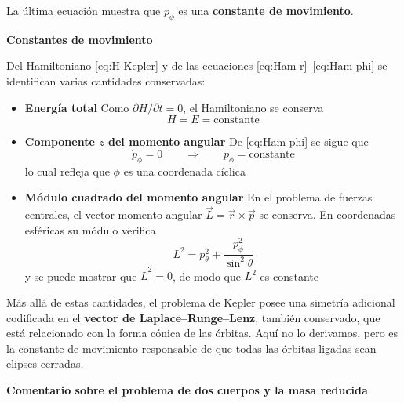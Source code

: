 \documentclass{article}
\begin{document}
La última ecuación muestra que $p_{\phi}$ es una \textbf{constante de
movimiento}.

\textcolor{trueblue}{\textbf{Constantes de movimiento}}

Del Hamiltoniano \eqref{eq:H-Kepler} y de las ecuaciones
\eqref{eq:Ham-r}–\eqref{eq:Ham-phi} se identifican varias cantidades
conservadas:

\begin{itemize}
  \item[$\bullet$] \textbf{Energía total}  
  Como $\partial H/\partial t = 0$, el Hamiltoniano se conserva
  \begin{equation}
  H = E = \text{constante}
  \label{eq:E-constante}
  \end{equation}

  \item[$\bullet$] \textbf{Componente $z$ del momento angular}  
  De \eqref{eq:Ham-phi} se sigue que
  \begin{equation}
  \dot p_{\phi} = 0
  \qquad\Rightarrow\qquad
  p_{\phi} = \text{constante}
  \label{eq:Lz-constante}
  \end{equation}
  lo cual refleja que $\phi$ es una coordenada cíclica

  \item[$\bullet$] \textbf{Módulo cuadrado del momento angular}  
  En el problema de fuerzas centrales, el vector momento angular
  $\vec L = \vec r \times \vec p$ se conserva. En coordenadas esféricas su
  módulo verifica
  \begin{equation}
  L^{2} = p_{\theta}^{2}
       + \frac{p_{\phi}^{2}}{\sin^{2}\theta}
  \label{eq:L2}
  \end{equation}
  y se puede mostrar que $\dot L^{2} = 0$, de modo que $L^{2}$ es constante
\end{itemize}

Más allá de estas cantidades, el problema de Kepler posee una simetría adicional
codificada en el \textbf{vector de Laplace–Runge–Lenz}, también conservado,
que está relacionado con la forma cónica de las órbitas. Aquí no lo derivamos,
pero es la constante de movimiento responsable de que todas las órbitas
ligadas sean elipses cerradas.

\textcolor{trueblue}{\textbf{Comentario sobre el problema de dos cuerpos y la masa reducida}}
\end{document}
